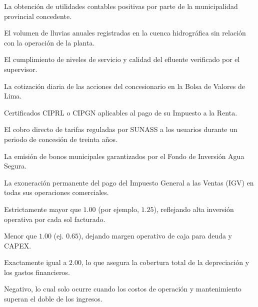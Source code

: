 \begin{opts}
    \item La obtención de utilidades contables positivas por parte de la municipalidad provincial concedente.
    \item El volumen de lluvias anuales registradas en la cuenca hidrográfica sin relación con la operación de la planta.
    \item El cumplimiento de niveles de servicio y calidad del efluente verificado por el supervisor.
    \item La cotización diaria de las acciones del concesionario en la Bolsa de Valores de Lima.
\end{opts}

\begin{opts}
    \item Certificados CIPRL o CIPGN aplicables al pago de su Impuesto a la Renta.
    \item El cobro directo de tarifas reguladas por SUNASS a los usuarios durante un periodo de concesión de treinta años.
    \item La emisión de bonos municipales garantizados por el Fondo de Inversión Agua Segura.
    \item La exoneración permanente del pago del Impuesto General a las Ventas (IGV) en todas sus operaciones comerciales.
\end{opts}

\begin{opts}
    \item Estrictamente mayor que $1.00$ (por ejemplo, $1.25$), reflejando alta inversión operativa por cada sol facturado.
    \item Menor que $1.00$ (ej. $0.65$), dejando margen operativo de caja para deuda y CAPEX.
    \item Exactamente igual a $2.00$, lo que asegura la cobertura total de la depreciación y los gastos financieros.
    \item Negativo, lo cual solo ocurre cuando los costos de operación y mantenimiento superan el doble de los ingresos.
\end{opts}

